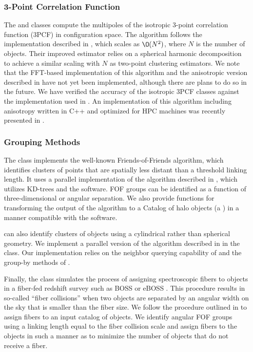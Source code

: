 \subsubsection{3-Point Correlation Function}

The  and  classes compute
the multipoles of the isotropic 3-point correlation function (3PCF) in
configuration space. The algorithm follows the implementation described in
\citet{Slepian:2015}, which scales as $\O(N^2)$, where $N$ is the
number of objects. Their improved estimator relies on a spherical harmonic
decomposition to achieve a similar scaling with $N$ as two-point clustering
estimators. We note that the FFT-based implementation of
this algorithm \citep[presented in][]{Slepian:2016} and the anisotropic
version described in \citet{Slepian:2017b} have not yet been implemented,
although there are plans to do so in the future. We have verified the
accuracy of the isotropic 3PCF classes against the implementation
used in \citet{Slepian:2015}. An implementation
of this algorithm including anisotropy written in C++ and
optimized for HPC machines was recently
presented in \citet{Friesen:2017}.

\subsubsection{Grouping Methods}

The  class implements the well-known Friends-of-Friends algorithm,
which identifies clusters of points that are spatially
less distant than a threshold linking length. It uses a
parallel implementation of the algorithm described in \citet{Feng:2017},
which utilizes KD-trees and the \kdcount{} software.
FOF groups can be identified as a function of
three-dimensional or angular separation.
We also provide functions for transforming the output of the 
algorithm to a Catalog of halo objects (a )
in a manner compatible with the \halotools{} software.

\nbkit{} can also identify clusters of objects using
a cylindrical rather than spherical geometry. We implement a parallel
version of the algorithm described in \citet{Okumura:2017} in the
 class. Our implementation relies on
the neighbor querying capability of \kdcount{} and the group-by methods
of \pandas{}.

Finally, the  class simulates the process of assigning
spectroscopic fibers to objects in a fiber-fed redshift survey
such as BOSS or eBOSS \citep{Dawson:2013, Dawson:2016}. This procedure
results in so-called ``fiber collisions'' when two objects are separated
by an angular width on the sky that is smaller than the fiber size. We
follow the procedure outlined in \citet{Guo:2012} to assign fibers to an input
catalog of objects. We identify angular FOF groups using a linking
length equal to the fiber collision scale and assign fibers to the objects
in such a manner as to minimize the number of objects that do not receive a
fiber.

